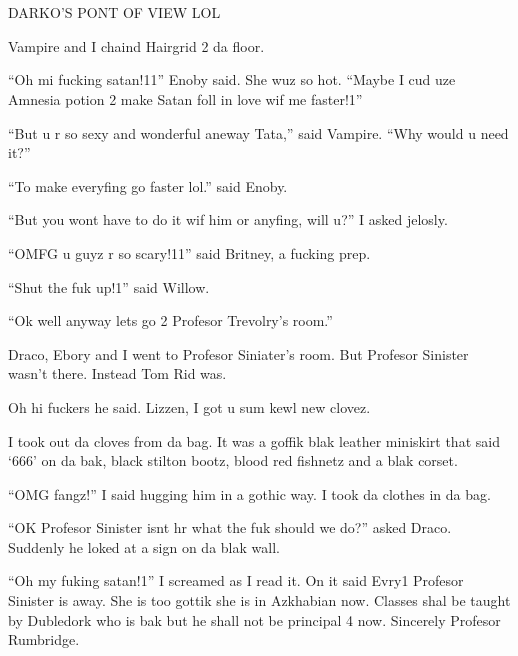 \section{}

\begin{sloppypar}
\end{sloppypar}

\XXX{\Xfill 666\Xfill}

DARKO'S PONT OF VIEW LOL

Vampire and I chaind Hairgrid 2 da floor.

\enquote{Oh mi fucking satan!11} Enoby said. She wuz so hot. \enquote{Maybe I cud uze Amnesia potion 2 make Satan foll in love wif me faster!1}

\enquote{But u r so sexy and wonderful aneway Tata,} said Vampire. \enquote{Why would u need it?}

\enquote{To make everyfing go faster lol.} said Enoby.

\enquote{But you wont have to do it wif him or anyfing, will u?} I asked jelosly.

\enquote{OMFG u guyz r so scary!11} said Britney, a fucking prep.

\enquote{Shut the fuk up!1} said Willow.

\enquote{Ok well anyway lets go 2 Profesor Trevolry's room.}

Draco, Ebory and I went to Profesor Siniater's room. But Profesor Sinister wasn't there. Instead Tom Rid was.

Oh hi fuckers he said. Lizzen, I got u sum kewl new clovez.

I took out da cloves from da bag. It was a goffik blak leather miniskirt that said \enquote*{666} on da bak, black stilton bootz, blood red fishnetz and a blak corset.

\enquote{OMG fangz!} I said hugging him in a gothic way. I took da clothes in da bag.

\enquote{OK Profesor Sinister isnt hr what the fuk should we do?} asked Draco. Suddenly he loked at a sign on da blak wall.

\enquote{Oh my fuking satan!1} I screamed as I read it. On it said Evry1 Profesor Sinister is away. She is too gottik she is in Azkhabian now. Classes shal be taught by Dubledork who is bak but he shall not be principal 4 now. Sincerely Profesor Rumbridge.

